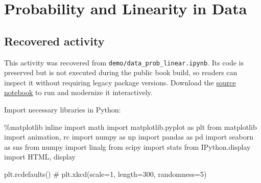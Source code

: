 \documentclass[
  letterpaper,
]{scrbook}
\newenvironment{Shaded}{\begin{snugshade}}{\end{snugshade}}
\newcommand{\CommentTok}[1]{\textcolor[rgb]{0.37,0.37,0.37}{#1}}
\newcommand{\ImportTok}[1]{\textcolor[rgb]{0.00,0.46,0.62}{#1}}
\newcommand{\NormalTok}[1]{\textcolor[rgb]{0.00,0.23,0.31}{#1}}
\newcommand{\OperatorTok}[1]{\textcolor[rgb]{0.37,0.37,0.37}{#1}}
\begin{document}
\chapter*{Probability and Linearity in
Data}\label{ch-lab-probability-linearity}


\section*{Recovered activity}\label{sec-lab-probability-linearity}


\begin{tcolorbox}[enhanced jigsaw, arc=.35mm, bottomrule=.15mm, bottomtitle=1mm, breakable, colback=white, colbacktitle=quarto-callout-note-color!10!white, colframe=quarto-callout-note-color-frame, coltitle=black, left=2mm, leftrule=.75mm, opacityback=0, opacitybacktitle=0.6, rightrule=.15mm, title=\textcolor{quarto-callout-note-color}{\faInfo}\hspace{0.5em}{Historical source and execution note}, titlerule=0mm, toprule=.15mm, toptitle=1mm]

This activity was recovered from \texttt{demo/data\_prob\_linear.ipynb}.
Its code is preserved but is not executed during the public book build,
so readers can inspect it without requiring legacy package versions.
Download the \href{../notebooks/probability-linearity.ipynb}{source
notebook} to run and modernize it interactively.

\end{tcolorbox}

Import necessary libraries in Python:

\begin{Shaded}
\begin{Highlighting}[]
\OperatorTok{\%}\NormalTok{matplotlib inline}
\ImportTok{import}\NormalTok{ math}
\ImportTok{import}\NormalTok{ matplotlib.pyplot }\ImportTok{as}\NormalTok{ plt}
\ImportTok{from}\NormalTok{ matplotlib }\ImportTok{import}\NormalTok{ animation, rc}
\ImportTok{import}\NormalTok{ numpy }\ImportTok{as}\NormalTok{ np}
\ImportTok{import}\NormalTok{ pandas }\ImportTok{as}\NormalTok{ pd}
\ImportTok{import}\NormalTok{ seaborn }\ImportTok{as}\NormalTok{ sns}
\ImportTok{from}\NormalTok{ numpy }\ImportTok{import}\NormalTok{ linalg}
\ImportTok{from}\NormalTok{ scipy }\ImportTok{import}\NormalTok{ stats}
\ImportTok{from}\NormalTok{ IPython.display }\ImportTok{import}\NormalTok{ HTML, display}

\NormalTok{plt.rcdefaults()}
\CommentTok{\# plt.xkcd(scale=1, length=300, randomness=5)}
\end{Highlighting}
\end{Shaded}
\end{document}
